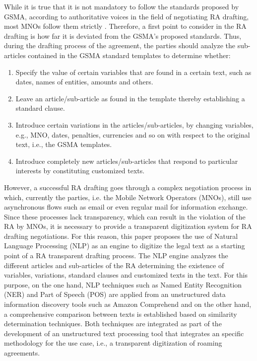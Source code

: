 \documentclass[conference]{style/IEEEtran}
\begin{document}
While it is true that it is not mandatory to follow the standards proposed by GSMA, according to authoritative voices in the field of negotiating RA drafting, most MNOs follow them strictly \cite{b4}. Therefore, a first point to consider in the RA drafting is how far it is deviated from the GSMA's proposed standards. Thus, during the drafting process of the agreement, the parties should analyze the sub-articles contained in the GSMA standard templates to determine whether:

\begin{enumerate}
\item Specify the value of certain variables that are found in a certain text, such as dates, names of entities, amounts and others.

\item Leave an article/sub-article as found in the template thereby establishing a standard clause.

\item Introduce certain variations in the articles/sub-articles, by changing variables, e.g., MNO, dates, penalties, currencies and so on with respect to the original text, i.e., the GSMA templates.

\item Introduce completely new articles/sub-articles that respond to particular interests by constituting customized texts.

\end{enumerate}

However, a successful RA drafting goes through a complex negotiation process in which, currently the parties, i.e. the Mobile Network Operators (MNOs), still use asynchronous flows such as email or even regular mail for information exchange. Since these processes lack transparency, which can result in the violation of the RA by MNOs, it is necessary to provide a transparent digitization system for RA drafting negotiations. For this reason, this paper proposes the use of Natural Language Processing (NLP) as an engine to digitize the legal text as a starting point of a RA transparent drafting process. The NLP engine analyzes the different articles and sub-articles of the RA determining the existence of variables, variations, standard clauses and customized texts in the text. For this purpose, on the one hand, NLP techniques such as Named Entity Recognition (NER) and Part of Speech (POS) are applied from an unstructured data information discovery tools such as Amazon Comprehend and on the other hand, a comprehensive comparison between texts is established based on similarity determination techniques. Both techniques are integrated as part of the development of an unstructured text processing tool that integrates an specific methodology for the use case, i.e., a transparent digitization of roaming agreements.
\end{document}
